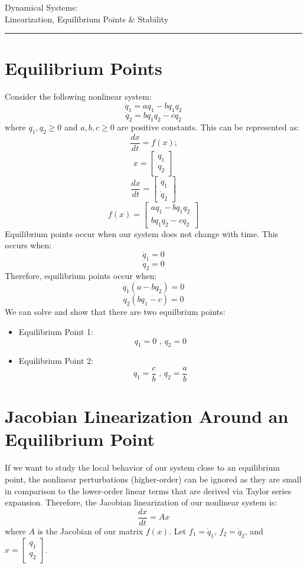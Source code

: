 \documentclass[12pt]{article}
\begin{document}
    \begin{flushleft}
	\LARGE Dynamical Systems: \\
	Linearization, Equilibrium Points \& Stability
    \end{flushleft} 
    \rule{\linewidth}{0.4pt}


    \section*{Equilibrium Points}

	Consider the following nonlinear system:
        $$\dot q_1 = aq_1 - bq_1q_2$$
		$$\dot q_2 = bq_1q_2-cq_2$$
	where $q_1, q_2 \geq 0$ and $a, b, c \geq 0$ are positive constants.
	This can be represented as:
		$$\frac{dx}{dt} = f(x) \text{;}$$	
		$$x = \begin{bmatrix} q_1 \\ q_2 \end{bmatrix}$$
		$$\frac{dx}{dt} = \begin{bmatrix} \dot q_1 \\ \dot q_2 \end{bmatrix}$$
		$$f(x) = \begin{bmatrix} aq_1 - bq_1q_2 \\ bq_1q_2-cq_2 \end{bmatrix}$$
	Equilibrium points occur when our system does not change with time. This occurs when:
		$$\dot q_1 = 0$$
		$$\dot q_2 = 0$$
	Therefore, equilibrium points occur when:
		$$q_1 (a-bq_2) = 0$$
		$$q_2 (bq_1-c) = 0$$
	We can solve and show that there are two equilbrium points:
	\begin{itemize}
		\item Equilibrium Point 1: 
			$$q_1=0 \text{ , } q_2=0 $$

		\item Equilibrium Point 2: 
			$$q_1= \frac{c}{b} \text{ , } q_2= \frac{a}{b}$$
	\end{itemize}

	\newpage

	\section*{Jacobian Linearization Around an Equilibrium Point}
	
	If we want to study the local behavior of our system close to an equilibrium point, the nonlinear perturbations (higher-order) can be ignored as they are small in comparison to the lower-order linear terms that are derived via Taylor series expansion. Therefore, the Jacobian linearization of our nonlinear system is:
		$$\frac{dx}{dt} = Ax$$
	where $A$ is the Jacobian of our matrix $f(x)$.
	Let $f_1 = \dot q_1$, $f_2 = \dot q_2$, and $x = \begin{bmatrix} q_1 \\ q_2 \end{bmatrix}$.
\end{document}
